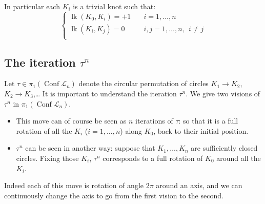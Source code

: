 \documentclass[11pt]{amsart}
\begin{document}
\bigskip

In particular each $K_i$ is a trivial knot such that:
\begin{equation*}
\left\{\begin{array}{ll}
{\mathop{\mathrm{lk}}\nolimits}(K_0,K_i)=+1  &\quad i=1,\ldots,n \\
{\mathop{\mathrm{lk}}\nolimits}(K_i,K_j)=0   &\quad i,j = 1,\ldots,n, \ \ i\neq j \\
\end{array}\right.
\end{equation*}

\subsection{The iteration $\tau^n$}

 

Let $\tau \in \pi_1({\mathop{\mathrm{Conf}}\nolimits} \mathcal{L}_n)$ denote the circular permutation of 
circles $K_1 \to K_2$, $K_2 \to K_3$,\ldots
It is important to understand the iteration $\tau^n$. 
We give two visions of $\tau^n$ in $\pi_1({\mathop{\mathrm{Conf}}\nolimits} \mathcal{L}_n)$.
\begin{itemize}
  \item This move can of course be seen as $n$ iterations of $\tau$: so that it is a 
full rotation of all the $K_i$ ($i=1,\ldots,n$) along $K_0$, back to their initial position.
  \item $\tau^n$ can be seen in another way: suppose that $K_1,\ldots,K_n$ are 
  sufficiently closed circles. Fixing those $K_i$, $\tau^n$ corresponds to a full rotation of $K_0$
around all the $K_i$. 
\end{itemize}
Indeed each of this move is rotation of angle $2\pi$ around an axis, 
and we can continuously change the axis to go from the first vision to the second.
\end{document}
